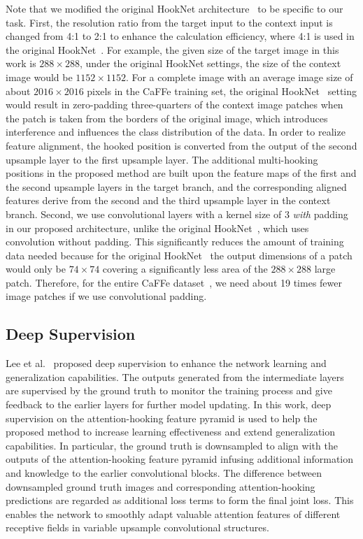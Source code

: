 \documentclass[lettersize,journal,siunitx]{IEEEtran}
\begin{document}
Note that we modified the original HookNet architecture~\cite{van2021hooknet} to be specific to our task. First, the resolution ratio from the target input to the context input is changed from 4:1 to 2:1 to enhance the calculation efficiency, where 4:1 is used in the original HookNet~\cite{van2021hooknet}. For example, the given size of the target image in this work is $288\times288$, under the original HookNet settings, the size of the context image would be $1152\times1152$. For a complete image with an average image size of about $2016\times2016$ pixels in the CaFFe training set, the original HookNet~\cite{van2021hooknet} setting would result in zero-padding three-quarters of the context image patches when the patch is taken from the borders of the original image, which introduces interference and influences the class distribution of the data. In order to realize feature alignment, the hooked position is converted from the output of the second upsample layer to the first upsample layer. The additional multi-hooking positions in the proposed method are built upon the feature maps of the first and the second upsample layers in the target branch, and the corresponding aligned features derive from the second and the third upsample layer in the context branch. Second, we use convolutional layers with a kernel size of 3 \emph{with} padding in our proposed architecture, unlike the original HookNet~\cite{van2021hooknet}, which uses convolution without padding. This significantly reduces the amount of training data needed because for the original HookNet~\cite{van2021hooknet} the output dimensions of a patch would only be $74\times74$ covering a significantly less area of the $288\times288$ large patch. Therefore, for the entire CaFFe dataset~\cite{essd-14-4287-2022}, we need about 19 times fewer image patches if we use convolutional padding.


\subsection{Deep Supervision}
Lee et al.~\cite{lee2015deeply} proposed deep supervision to enhance the network learning and generalization capabilities. The outputs generated from the intermediate layers are supervised by the ground truth to monitor the training process and give feedback to the earlier layers for further model updating. In this work, deep supervision on the attention-hooking feature pyramid is used to help the proposed method to increase learning effectiveness and extend generalization capabilities. In particular, the ground truth is downsampled to align with the outputs of the attention-hooking feature pyramid infusing additional information and knowledge to the earlier convolutional blocks. The difference between downsampled ground truth images and corresponding attention-hooking predictions are regarded as additional loss terms to form the final joint loss. This enables the network to smoothly adapt valuable attention features of different receptive fields in variable upsample convolutional structures.
\end{document}

